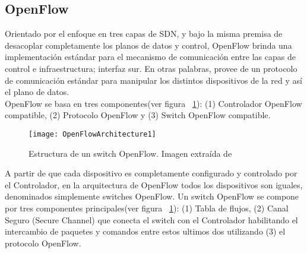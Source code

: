 \subsection{OpenFlow}
Orientado por el enfoque en tres capas de SDN, y bajo la misma premisa de desacoplar completamente los planos de datos y control, OpenFlow\cite{mckeown2008openflow} brinda una implementaci\'on estándar para el mecanismo de comunicación entre las capas de control e infraestructura; interfaz sur. En otras palabras, provee de un protocolo de comunicación estándar para manipular los distintos dispositivos de la red y así el plano de datos.\\ 

OpenFlow se basa en tres componentes(ver figura ~\ref{fig:OpenFlowArch}): (1) Controlador OpenFlow compatible, (2) Protocolo OpenFlow y (3) Switch OpenFlow compatible.

  


\begin{figure}[htbp!] 
\centering    
\texttt{[image: OpenFlowArchitecture1]}
\caption[Estructura de un switch OpenFlow]{Estructura de un switch OpenFlow. Imagen extraída de \cite{mckeown2008openflow}}
\label{fig:OpenFlowArch}
\end{figure}

A partir de que cada dispositivo es completamente configurado y controlado por el Controlador, en la arquitectura de OpenFlow todos los dispositivos son iguales, denominados simplemente switches OpenFlow. Un switch OpenFlow se compone por tres componentes principales(ver figura ~\ref{fig:OpenFlowArch}): (1) Tabla de flujos, (2) Canal Seguro (Secure Channel) que conecta el switch con el Controlador habilitando el intercambio de paquetes y comandos entre estos ultimos dos utilizando (3) el protocolo OpenFlow.\\
 
